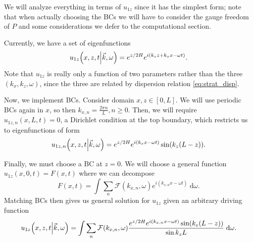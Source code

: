 \documentclass[11pt,
        usenames, %
        dvipsnames %
    ]{report}
\DeclarePairedDelimiter\p{\lparen}{\rparen}
\begin{document}
We will analyze everything in terms of $u_{1z}$ since it has the simplest form;
note that when actually choosing the BCs we will have to consider the gauge
freedom of $P$ and some considerations we defer to the computational section.

Currently, we have a set of eigenfunctions
\begin{equation}
    u_{1z}\p*{x, z, t \middle| \vec{k}, \omega}
        = e^{z/2H} e^{i(k_zz + k_xx - \omega t)}.
        \label{eq:strat.uz_eigen}
\end{equation}
Note that $u_{1z}$ is really only a function of two parameters rather than the
three $(k_x, k_z, \omega)$, since the three are related by dispersion relation
\autoref{eq:strat_disp}.

Now, we implement BCs. Consider domain $x, z \in [0, L]$. We will use periodic
BCs again in $x$, so then $k_{x, n} = \frac{2\pi n}{L}, n \geq 0$. Then, we will
require $u_{1z, n}(x, L, t) = 0$, a Dirichlet condition at the top boundary,
which restricts us to eigenfunctions of form
\begin{equation}
    u_{1z, n}\p*{x, z, t \middle| \vec{k}, \omega}
        = e^{z/2H}e^{i(k_xx - \omega t)}\sin\p*{k_z\p*{L - z}}.
        \label{eq:strat.uz_eigen_l-z}
\end{equation}

Finally, we must choose a BC at $z = 0$. We will choose a general function
$u_{1z}(x, 0, t) = F(x, t)$ where we can decompose
\begin{equation}
    F(x, t) = \int\limits \sum\limits_n \mathcal{F}(k_{x, n}, \omega)
        e^{i(k_{x, n}x - \omega t)}\;\mathrm{d}\omega.
\end{equation}
Matching BCs then gives us general solution for $u_{1z}$ given an arbitrary
driving function
\begin{equation}
    u_{1z}\p*{x, z, t \middle| \vec{k}, \omega}
        = \int\limits \sum\limits_n \mathcal{F}\p*{k_{x, n}, \omega}
            \frac{e^{z/2H}e^{i\p*{k_{x, n}x - \omega t}}\sin \p*{k_z(L - z)}}{
            \sin k_zL}\;\mathrm{d}\omega.
            \label{eq:strat.full_sol}
\end{equation}
\end{document}
